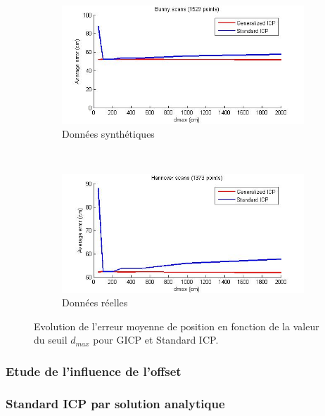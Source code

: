 \begin{figure}[!h]
   \centering
   \begin{subfigure}[t]{.5\linewidth}
     \centering
     \includegraphics[scale=0.4]{Images/bunny_evol_error_dmax.jpg}
     \caption{Données synthétiques}
   \end{subfigure}%
   ~
   \begin{subfigure}[t]{.5\linewidth}
     \centering
     \includegraphics[scale=0.4]{Images/hannover_evol_error_dmax.jpg}
     \caption{Données réelles}
   \end{subfigure}
   
   \caption{Evolution de l'erreur moyenne de position en fonction de la valeur du seuil $d_{max}$ pour GICP et Standard ICP.}
   \label{fig:choix}
\end{figure}

\subsubsection{Etude de l'influence de l'offset}
\subsubsection{Standard ICP par solution analytique}